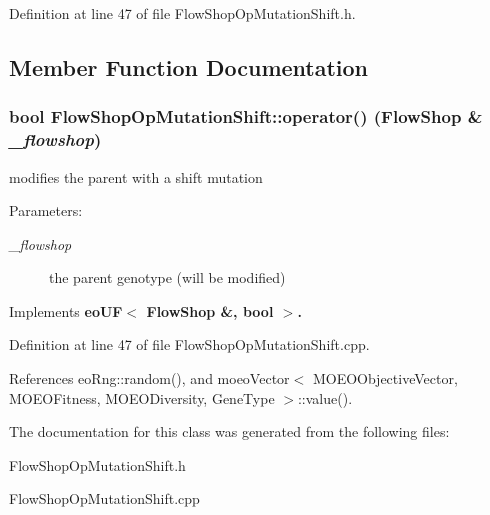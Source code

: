 Definition at line 47 of file Flow\-Shop\-Op\-Mutation\-Shift.h.

\subsection{Member Function Documentation}
\subsubsection{\setlength{\rightskip}{0pt plus 5cm}bool Flow\-Shop\-Op\-Mutation\-Shift::operator() (\bf{Flow\-Shop} \& {\em \_\-flowshop})\hspace{0.3cm}{\tt  [virtual]}}\label{classFlowShopOpMutationShift_c000b017e75ddee3b6fe9db8ea5ddd5b}


modifies the parent with a shift mutation 

\begin{Desc}
\item[Parameters:]
\begin{description}
\item[{\em \_\-flowshop}]the parent genotype (will be modified) \end{description}
\end{Desc}


Implements \bf{eo\-UF$<$ Flow\-Shop \&, bool $>$}.

Definition at line 47 of file Flow\-Shop\-Op\-Mutation\-Shift.cpp.

References eo\-Rng::random(), and moeo\-Vector$<$ MOEOObjective\-Vector, MOEOFitness, MOEODiversity, Gene\-Type $>$::value().

The documentation for this class was generated from the following files:\begin{CompactItemize}
\item 
Flow\-Shop\-Op\-Mutation\-Shift.h\item 
Flow\-Shop\-Op\-Mutation\-Shift.cpp\end{CompactItemize}
